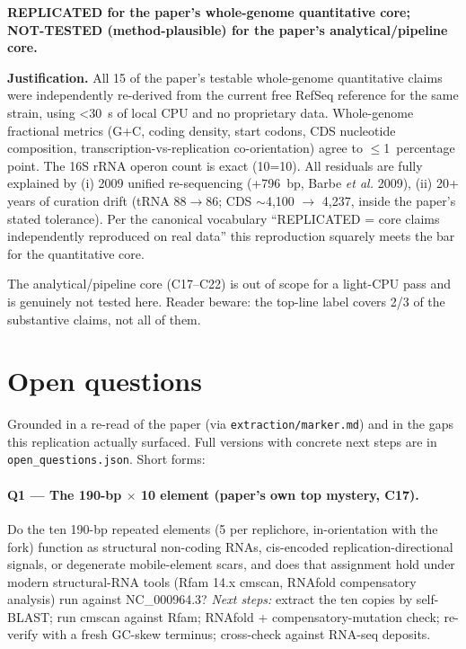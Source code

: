 \documentclass[11pt,letterpaper]{article}
\begin{document}
\textbf{REPLICATED for the paper's whole-genome quantitative core;\\
NOT-TESTED (method-plausible) for the paper's analytical/pipeline core.}

\textbf{Justification.} All 15 of the paper's testable whole-genome quantitative claims were independently re-derived from the current free RefSeq reference for the same strain, using \textless{}30~s of local CPU and no proprietary data. Whole-genome fractional metrics (G+C, coding density, start codons, CDS nucleotide composition, transcription-vs-replication co-orientation) agree to $\leq$1~percentage point. The 16S rRNA operon count is exact (10=10). All residuals are fully explained by (i) 2009 unified re-sequencing (+796~bp, Barbe \emph{et al.} 2009), (ii) 20+ years of curation drift (tRNA 88$\rightarrow$86; CDS $\sim$4,100 $\rightarrow$ 4,237, inside the paper's stated tolerance). Per the canonical vocabulary ``REPLICATED = core claims independently reproduced on real data'' this reproduction squarely meets the bar for the quantitative core.

The analytical/pipeline core (C17--C22) is out of scope for a light-CPU pass and is genuinely not tested here. Reader beware: the top-line label covers 2/3 of the substantive claims, not all of them.

\section{Open questions}
\label{sec:openq}

Grounded in a re-read of the paper (via \texttt{extraction/marker.md}) and in the gaps this replication actually surfaced. Full versions with concrete next steps are in \texttt{open\_questions.json}. Short forms:

\paragraph{Q1 --- The 190-bp $\times$ 10 element (paper's own top mystery, C17).}
Do the ten 190-bp repeated elements (5 per replichore, in-orientation with the fork) function as structural non-coding RNAs, cis-encoded replication-directional signals, or degenerate mobile-element scars, and does that assignment hold under modern structural-RNA tools (Rfam 14.x cmscan, RNAfold compensatory analysis) run against NC\_000964.3?
\textit{Next steps:} extract the ten copies by self-BLAST; run cmscan against Rfam; RNAfold + compensatory-mutation check; re-verify with a fresh GC-skew terminus; cross-check against RNA-seq deposits.
\end{document}
